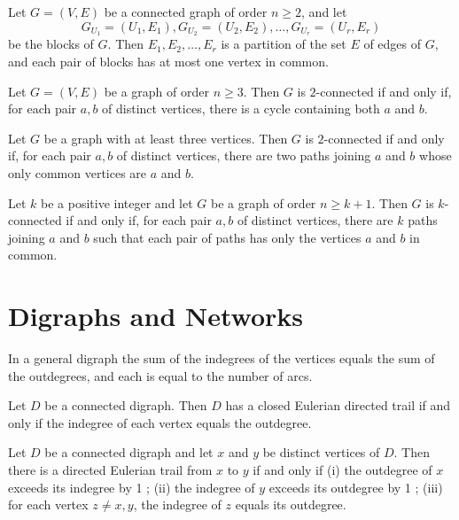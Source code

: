\begin{theorem}
  \label{thm:12.6.4}
  Let $G=(V, E)$ be a connected graph of order $n \geq 2$, and let
  $$
  G_{U_1}=\left(U_1, E_1\right), G_{U_2}=\left(U_2, E_2\right), \ldots, G_{U_r}=\left(U_r, E_r\right)
  $$
  be the blocks of $G$. Then $E_1, E_2, \ldots, E_r$ is a partition of the set $E$ of edges of $G$, and each pair of blocks has at most one vertex in common.
\end{theorem}

\begin{theorem}
  \label{thm:12.6.5}
  Let $G = (V, E)$ be a graph of order $n \geq 3$. Then $G$ is $2$-connected if and only if, for each pair $a, b$ of distinct vertices, there is a cycle containing both $a$ and $b$.
\end{theorem}

\begin{corollary}
  \label{cor:12.6.6}
  Let $G$ be a graph with at least three vertices. Then $G$ is $2$-connected if and only if, for each pair $a, b$ of distinct vertices, there are two paths joining $a$ and $b$ whose only common vertices are $a$ and $b$.
\end{corollary}

\begin{theorem}
  \label{thm:12.6.7}
  Let $k$ be a positive integer and let $G$ be a graph of order $n \geq k +1$. Then $G$ is $k$-connected if and only if, for each pair $a, b$ of distinct vertices, there are $k$ paths joining $a$ and $b$ such that each pair of paths has only the vertices $a$ and $b$ in common.
\end{theorem}

\chapter{Digraphs and Networks}

\begin{theorem}
  \label{thm:13.1.1}
  In a general digraph the sum of the indegrees of the vertices equals the sum of the outdegrees, and each is equal to the number of arcs.
\end{theorem}

\begin{theorem}
  \label{thm:13.1.2}
  Let $D$ be a connected digraph. Then $D$ has a closed Eulerian directed trail if and only if the indegree of each vertex equals the outdegree.
\end{theorem}

\begin{theorem}
  \label{thm:13.1.3}
  Let $D$ be a connected digraph and let $x$ and $y$ be distinct vertices of $D$. Then there is a directed Eulerian trail from $x$ to $y$ if and only if
  (i) the outdegree of $x$ exceeds its indegree by 1 ;
  (ii) the indegree of $y$ exceeds its outdegree by 1 ;
  (iii) for each vertex $z \neq x, y$, the indegree of $z$ equals its outdegree.
\end{theorem}

